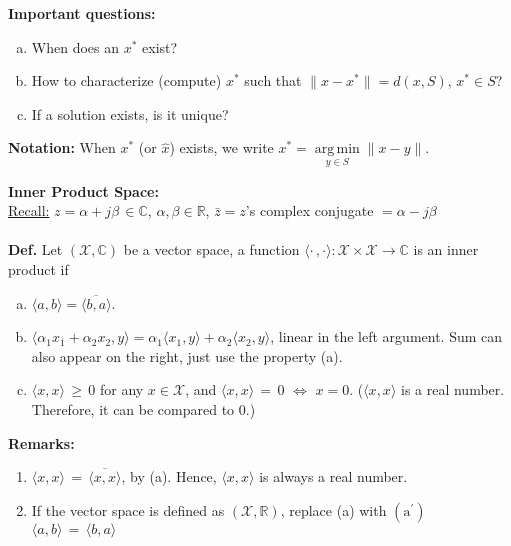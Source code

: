 \documentclass[letterpaper]{article}
\DeclareMathOperator*{\argmin}{arg\,min}
\begin{document}
\noindent \textbf{Important questions:}
\vspace{-5mm}
\begin{enumerate}[a)]
    \item When does an $x^{*}$ exist?
    \item How to characterize (compute) $x^{*}$ such that $\|x-x^{*}\| = d(x, S)$, $x^{*}\in S$?
    \item If a solution exists, is it unique?
\end{enumerate}

\noindent \textbf{Notation:} When $x^{*}$ (or $\hat{x}$) exists, we write $x^{*} = {\underset{y \in S}{\operatorname{\argmin}}} \|x-y\|$.

\noindent \textbf{Inner Product Space:}\\
    \underline{Recall:}  $z = \alpha + j\beta \, \in \mathbb{C}$, $\alpha, \beta \in \mathbb{R}$, $\bar{z} = z$'s complex conjugate $= \alpha -  j\beta$\\
\\
\noindent \textbf{Def.}
    Let $(\mathcal{X}, \mathbb{C})$ be a vector space, a function $\langle \cdot \, , \cdot \rangle: \mathcal{X} \times \mathcal{X} \rightarrow \mathbb{C}$
is an inner product if
    \vspace{-5mm}
    \begin{enumerate}[(a)]
        \item $\langle a, b\rangle = \overline{\langle b, a\rangle}$.
        \item $\langle \alpha_1 x_1 + \alpha_2 x_2, y \rangle = \alpha_1 \langle x_1, y \rangle + \alpha_2 \langle x_2, y \rangle$, linear in the left argument. Sum can also appear on the right, just use the property (a).
        \item $\langle x, x \rangle \, \ge \, 0$ for any $x \in \mathcal{X}$, and $\langle x, x \rangle\,=\, 0$ $\Leftrightarrow$ $x = 0$. ($\langle x, x \rangle$ is a real number. Therefore, it can be compared to 0.)
    \end{enumerate}

\noindent \textbf{Remarks:}
    \vspace{-5mm}
    \begin{enumerate}[1)]
        \item $\langle x, x \rangle\, =\, \overline{\langle x, x \rangle}$, by (a). Hence, $\langle x, x \rangle$ is always a real number.
        \item If the vector space is defined as $(\mathcal{X}, \mathbb{R})$, replace (a) with $(\text{a}^{'})$ $\langle a, b \rangle \, =\, \langle b, a \rangle$
    \end{enumerate}
\end{document}
